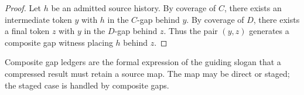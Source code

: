\begin{proof}
Let \(h\) be an admitted source history. By coverage of \(C\), there exists an intermediate token \(y\) with \(h\) in the \(C\)-gap behind \(y\). By coverage of \(D\), there exists a final token \(z\) with \(y\) in the \(D\)-gap behind \(z\). Thus the pair \((y,z)\) generates a composite gap witness placing \(h\) behind \(z\).
\end{proof}

\begin{remark}
Composite gap ledgers are the formal expression of the guiding slogan that a compressed result must retain a source map. The map may be direct or staged; the staged case is handled by composite gaps.
\end{remark}

